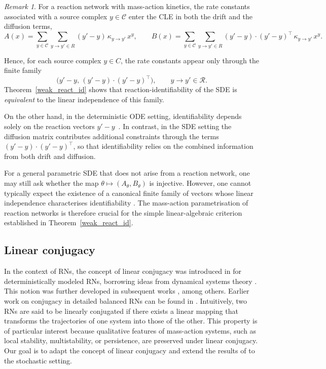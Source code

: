 \documentclass[10pt,a4paper]{amsart}
\theoremstyle{definition}
\theoremstyle{remark}
\newtheorem{remark}[theorem]{Remark}
\theoremstyle{consequence}
\def\cC{\mathcal{C}}
\numberwithin{equation}{section}
\begin{document}
\begin{remark}
\label{rem:nontrivial}
For a reaction network with mass-action kinetics, the rate constants associated
with a source complex $y\in \cC$ enter the CLE in both the drift and the diffusion terms,
\[
A(x)
= \sum_{y\in \mathcal{C}}\sum_{y\to y'\in R} (y'-y)\,\kappa_{y\to y'}\, x^y,
\qquad
B(x)
= \sum_{y\in \mathcal{C}}\sum_{y\to y'\in R} (y'-y)\cdot(y'-y)^{\intercal}\,\kappa_{y\to y'}\, x^y.
\]

Hence, for each source complex $y\in C$, the rate constants appear only through the
finite family
\[
\bigl( y'-y,\,(y'-y)\cdot(y'-y)^{\intercal} \bigr),
\qquad y\to y'\in \mathcal{R}.
\]
Theorem~\ref{weak_react_id} shows that reaction-identifiability of the SDE is
\emph{equivalent} to the linear independence of this family.

On the other hand, in the deterministic ODE setting, identifiability depends solely on the reaction
vectors $y'-y$~\cite{craciun2}. In contrast, in the SDE
setting the diffusion matrix contributes additional constraints through the terms
$(y'-y)\cdot(y'-y)^{\intercal}$, so that identifiability relies on the combined information from both drift and diffusion.

For a general parametric SDE that does not arise from a reaction network, one may still ask whether the map $\theta \mapsto (A_\theta,B_\theta)$ is injective. However, one cannot typically expect the existence of a canonical finite family of vectors whose linear independence characterises identifiability \cite{SDE_inference}. The mass-action parametrisation of reaction networks is therefore crucial for the simple linear-algebraic criterion established in Theorem~\ref{weak_react_id}.
\end{remark}

\subsection{Linear conjugacy}
In the context of RNs, the concept of linear conjugacy was introduced in \cite{johnston2011linear} for deterministically modeled RNs, borrowing ideas from dynamical systems theory \cite{perko2001differential}. This notion was further developed in subsequent works \cite{johnston2012linear, johnston2013computing, nazareno2019linear}, among others. Earlier work on conjugacy in detailed balanced RNs can be found in \cite{krambeck1970mathematical}. Intuitively, two RNs are said to be linearly conjugated if there exists a linear mapping that transforms the trajectories of one system into those of the other. This property is of particular interest because qualitative features of mass-action systems, such as local stability, multistability, or persistence, are preserved under linear conjugacy.
Our goal is to adapt the concept of linear conjugacy and extend the results of \cite{johnston2011linear} to the stochastic setting. 
\end{document}
